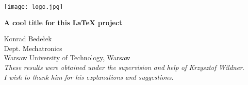 \documentclass[final]{beamer}
\begin{document}
\begin{frame}

\begin{center}
  \begin{minipage}{.19\linewidth}
    \texttt{[image: logo.jpg]}
  \end{minipage}
  \begin{minipage}{.6\linewidth}
    \begin{center}
      \Huge \textbf{A cool title for this LaTeX project}
    \end{center}
  \end{minipage}
  \hspace{.03\linewidth}
  \begin{minipage}{0.16\linewidth}
    \begin{flushright}
      Konrad Bedełek\\
      Dept. Mechatronics\\
      Warsaw University of Technology, Warsaw\\
      \vspace{.1cm} \small \emph{These results were obtained under the
        supervision and help of Krzysztof Wildner. I wish to thank
        him for his explanations and suggestions.}
    \end{flushright}
  \end{minipage}
\end{center}

\vspace{.1cm}


\setlength{\columnsep}{1cm}
\begin{multicols}{3}
\noindent
{}
\vspace{.3cm}




\end{multicols}
\end{frame}
\end{document}
